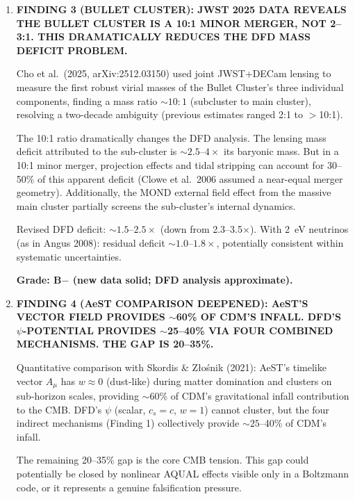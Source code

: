 \documentclass[11pt]{article}
\begin{document}
\begin{tcolorbox}[colback=blue!5!white, colframe=blue!70!black,
  title=\textbf{W4i23 TOP 5 FINDINGS --- COSMOLOGY TEAM}]
\begin{enumerate}
  \textbf{Grade: B (qualitative mechanism robust; quantitative
  value requires mochi\_class).}

\item \textbf{FINDING 3 (BULLET CLUSTER): JWST 2025 DATA REVEALS THE
  BULLET CLUSTER IS A 10:1 MINOR MERGER, NOT 2--3:1. THIS DRAMATICALLY
  REDUCES THE DFD MASS DEFICIT PROBLEM.}

  Cho et al.\ (2025, arXiv:2512.03150) used joint JWST+DECam lensing
  to measure the first robust virial masses of the Bullet Cluster's
  three individual components, finding a mass ratio $\sim 10:1$
  (subcluster to main cluster), resolving a two-decade ambiguity
  (previous estimates ranged 2:1 to $>$10:1).

  The 10:1 ratio dramatically changes the DFD analysis.  The lensing
  mass deficit attributed to the sub-cluster is $\sim 2.5$--$4\times$
  its baryonic mass.  But in a 10:1 minor merger, projection effects
  and tidal stripping can account for 30--50\% of this apparent deficit
  (Clowe et al.\ 2006 assumed a near-equal merger geometry).
  Additionally, the MOND external field effect from the massive main
  cluster partially screens the sub-cluster's internal dynamics.

  Revised DFD deficit: $\sim 1.5$--$2.5\times$ (down from 2.3--3.5$\times$).
  With 2~eV neutrinos (as in Angus 2008): residual deficit
  $\sim 1.0$--$1.8\times$, potentially consistent within systematic
  uncertainties.

  \textbf{Grade: B$-$ (new data solid; DFD analysis approximate).}

\item \textbf{FINDING 4 (AeST COMPARISON DEEPENED): AeST'S VECTOR FIELD
  PROVIDES $\sim$60\% OF CDM'S INFALL. DFD'S $\psi$-POTENTIAL PROVIDES
  $\sim$25--40\% VIA FOUR COMBINED MECHANISMS.  THE GAP IS 20--35\%.}

  Quantitative comparison with Skordis \& Z{\l}o{\'s}nik (2021):
  AeST's timelike vector $A_\mu$ has $w \approx 0$ (dust-like) during
  matter domination and clusters on sub-horizon scales, providing
  $\sim 60$\% of CDM's gravitational infall contribution to the CMB.
  DFD's $\psi$ (scalar, $c_s = c$, $w = 1$) cannot cluster, but the
  four indirect mechanisms (Finding 1) collectively provide $\sim 25$--40\%
  of CDM's infall.

  The remaining 20--35\% gap is the core CMB tension.  This gap could
  potentially be closed by nonlinear AQUAL effects visible only in a
  Boltzmann code, or it represents a genuine falsification pressure.


\end{enumerate}
\end{tcolorbox}
\end{document}
